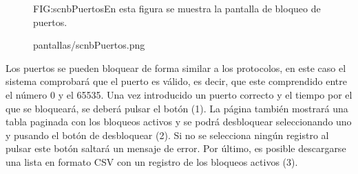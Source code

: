 \begin{figure}[Pantalla de bloqueo de puertos]{FIG:scnbPuertos}{En esta figura se muestra la pantalla de bloqueo de puertos.}
  \begin{image}{}{}{pantallas/scnbPuertos.png}
  \end{image}
\end{figure}

Los puertos se pueden bloquear de forma similar a los protocolos, en este caso el sistema comprobará que el puerto es válido, es decir, que este comprendido entre el número 0 y el 65535. Una vez introducido un puerto correcto y el tiempo por el que se bloqueará, se deberá pulsar el botón (1). La página también mostrará una tabla paginada con los bloqueos activos y se podrá desbloquear seleccionando uno y pusando el botón de desbloquear (2). Si no se selecciona ningún registro al pulsar este botón saltará un mensaje de error. Por último, es posible descargarse una lista en formato CSV con un registro de los bloqueos activos (3).